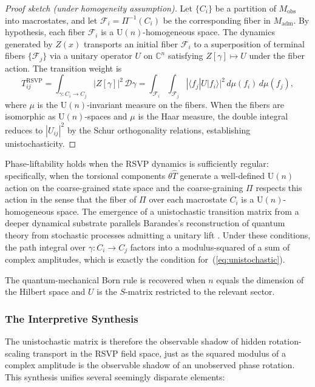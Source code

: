 \documentclass[12pt,a4paper]{article}
\theoremstyle{remark}
\begin{document}
\begin{proof}[Proof sketch (under homogeneity assumption)]
Let $\{C_i\}$ be a partition of $M_{\mathrm{obs}}$ into macrostates, and
let $\mathcal{F}_i = \Pi^{-1}(C_i)$ be the corresponding fiber in
$M_{\mathrm{adm}}$. By hypothesis, each fiber $\mathcal{F}_i$ is a
$\mathrm{U}(n)$-homogeneous space. The dynamics generated by $Z(x)$
transports an initial fiber $\mathcal{F}_i$ to a superposition of
terminal fibers $\{\mathcal{F}_j\}$ via a unitary operator $U$ on
$\mathbb{C}^n$ satisfying $Z[\gamma] \mapsto U$ under the fiber action.
The transition weight is
\begin{equation*}
  T_{ij}^{\mathrm{RSVP}}
  = \int_{\gamma : C_i \to C_j} |Z[\gamma]|^2\,\mathcal{D}\gamma
  = \int_{\mathcal{F}_i}\!\int_{\mathcal{F}_j}
    |\langle f_j | U | f_i\rangle|^2\,d\mu(f_i)\,d\mu(f_j),
\end{equation*}
where $\mu$ is the $\mathrm{U}(n)$-invariant measure on the fibers. When
the fibers are isomorphic as $\mathrm{U}(n)$-spaces and $\mu$ is the
Haar measure, the double integral reduces to $|U_{ij}|^2$ by the
Schur orthogonality relations, establishing unistochasticity.
\end{proof}

Phase-liftability holds when the RSVP dynamics is sufficiently regular:
specifically, when the torsional components $\theta\widehat{T}$ generate
a well-defined $\mathrm{U}(n)$ action on the coarse-grained state space
and the coarse-graining $\Pi$ respects this action in the sense that the
fiber of $\Pi$ over each macrostate $C_i$ is a $\mathrm{U}(n)$-homogeneous
space. The emergence of a unistochastic transition matrix from a deeper
dynamical substrate parallels Barandes's reconstruction of quantum theory
from stochastic processes admitting a unitary lift
\cite{barandes2023,barandes2024}. Under these conditions, the path integral over
$\gamma : C_i \to C_j$ factors into a modulus-squared of a sum of
complex amplitudes, which is exactly the condition for~(\ref{eq:unistochastic}).

The quantum-mechanical Born rule is recovered when $n$ equals the dimension
of the Hilbert space and $U$ is the $S$-matrix restricted to the relevant
sector.

\subsubsection*{The Interpretive Synthesis}

The unistochastic matrix is therefore the observable shadow of hidden
rotation-scaling transport in the RSVP field space, just as the squared
modulus of a complex amplitude is the observable shadow of an unobserved
phase rotation. This synthesis unifies several seemingly disparate elements:
\end{document}
